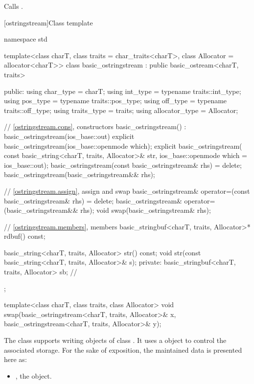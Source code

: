 \begin{itemdescr}
\pnum
\effects
Calls
.
\end{itemdescr}

[ostringstream]{Class template }

%
\begin{codeblock}
namespace std {
  template<class charT, class traits = char_traits<charT>,
           class Allocator = allocator<charT>>
  class basic_ostringstream : public basic_ostream<charT, traits> {
  public:
    using char_type      = charT;
    using int_type       = typename traits::int_type;
    using pos_type       = typename traits::pos_type;
    using off_type       = typename traits::off_type;
    using traits_type    = traits;
    using allocator_type = Allocator;

    // \ref{ostringstream.cons}, constructors
    basic_ostringstream() : basic_ostringstream(ios_base::out) {}
    explicit basic_ostringstream(ios_base::openmode which);
    explicit basic_ostringstream(
      const basic_string<charT, traits, Allocator>& str,
      ios_base::openmode which = ios_base::out);
    basic_ostringstream(const basic_ostringstream& rhs) = delete;
    basic_ostringstream(basic_ostringstream&& rhs);

    // \ref{ostringstream.assign}, assign and swap
    basic_ostringstream& operator=(const basic_ostringstream& rhs) = delete;
    basic_ostringstream& operator=(basic_ostringstream&& rhs);
    void swap(basic_ostringstream& rhs);

    // \ref{ostringstream.members}, members
    basic_stringbuf<charT, traits, Allocator>* rdbuf() const;

    basic_string<charT, traits, Allocator> str() const;
    void str(const basic_string<charT, traits, Allocator>& s);
   private:
    basic_stringbuf<charT, traits, Allocator> sb; // \expos
  };

  template<class charT, class traits, class Allocator>
    void swap(basic_ostringstream<charT, traits, Allocator>& x,
              basic_ostringstream<charT, traits, Allocator>& y);
}
\end{codeblock}

\pnum
The class
supports writing objects of class
.
It uses a
object to control the associated storage.
For the sake of exposition, the maintained data is presented here as:
\begin{itemize}
\item
{}, the  object.
\end{itemize}

